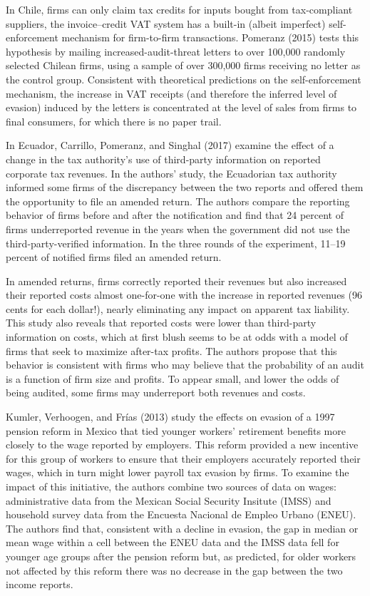 \documentclass[
  12pt]{article}
\theoremstyle{definition}
\theoremstyle{remark}
\begin{document}
In Chile, firms can only claim tax credits for inputs bought from
tax-compliant suppliers, the invoice--credit VAT system has a built-in
(albeit imperfect) self-enforcement mechanism for firm-to-firm
transactions. Pomeranz (2015) tests this hypothesis by mailing
increased-audit-threat letters to over 100,000 randomly selected Chilean
firms, using a sample of over 300,000 firms receiving no letter as the
control group. Consistent with theoretical predictions on the
self-enforcement mechanism, the increase in VAT receipts (and therefore
the inferred level of evasion) induced by the letters is concentrated at
the level of sales from firms to final consumers, for which there is no
paper trail.

In Ecuador, Carrillo, Pomeranz, and Singhal (2017) examine the effect of
a change in the tax authority's use of third-party information on
reported corporate tax revenues. In the authors' study, the Ecuadorian
tax authority informed some firms of the discrepancy between the two
reports and offered them the opportunity to file an amended return. The
authors compare the reporting behavior of firms before and after the
notification and find that 24 percent of firms underreported revenue in
the years when the government did not use the third-party-verified
information. In the three rounds of the experiment, 11--19 percent of
notified firms filed an amended return.

In amended returns, firms correctly reported their revenues but also
increased their reported costs almost one-for-one with the increase in
reported revenues (96 cents for each dollar!), nearly eliminating any
impact on apparent tax liability. This study also reveals that reported
costs were lower than third-party information on costs, which at first
blush seems to be at odds with a model of firms that seek to maximize
after-tax profits. The authors propose that this behavior is consistent
with firms who may believe that the probability of an audit is a
function of firm size and profits. To appear small, and lower the odds
of being audited, some firms may underreport both revenues and costs.

Kumler, Verhoogen, and Frías (2013) study the effects on evasion of a
1997 pension reform in Mexico that tied younger workers' retirement
benefits more closely to the wage reported by employers. This reform
provided a new incentive for this group of workers to ensure that their
employers accurately reported their wages, which in turn might lower
payroll tax evasion by firms. To examine the impact of this initiative,
the authors combine two sources of data on wages: administrative data
from the Mexican Social Security Insitute (IMSS) and household survey
data from the Encuesta Nacional de Empleo Urbano (ENEU). The authors
find that, consistent with a decline in evasion, the gap in median or
mean wage within a cell between the ENEU data and the IMSS data fell for
younger age groups after the pension reform but, as predicted, for older
workers not affected by this reform there was no decrease in the gap
between the two income reports.
\end{document}
